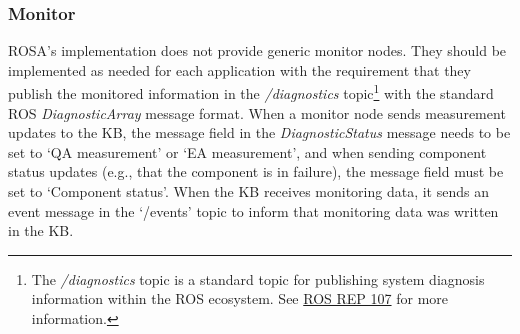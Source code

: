 \begin{listing}
\caption{TypeDB query to fetch selectable actions' names}%
\label{lst:typedb_query}
\end{listing}

\subsubsection{Monitor}
ROSA's implementation does not provide generic monitor nodes. They should be implemented as needed for each application with the requirement that they publish the monitored information in the \emph{/diagnostics} topic\footnote{The \emph{/diagnostics} topic is a standard topic for publishing system diagnosis information within the ROS ecosystem. See \href{https://www.ros.org/reps/rep-0107.html}{ROS REP 107} for more information.} with the standard ROS \emph{DiagnosticArray} message format.
When a monitor node sends measurement updates to the KB, the message field in the \emph{DiagnosticStatus} message needs to be set to `QA measurement' or `EA measurement', and when sending component status updates (e.g., that the component is in failure), the message field must be set to `Component status'. When the KB receives monitoring data, it sends an event message in the `/events' topic to inform that monitoring data was written in the KB\@.

